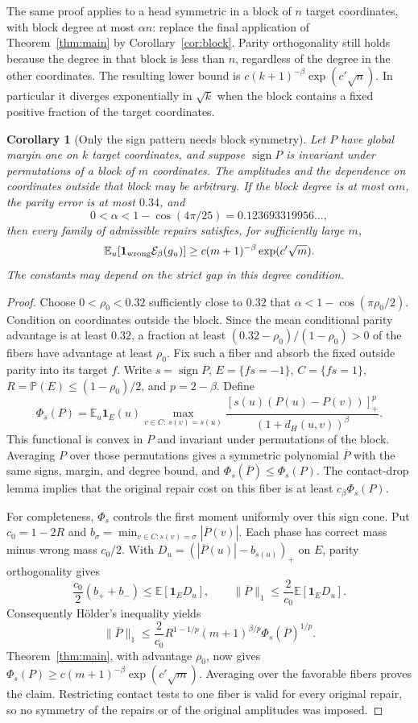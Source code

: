 \documentclass[11pt]{article}
\newtheorem{corollary}[theorem]{Corollary}
\theoremstyle{remark}\newtheorem{remark}[theorem]{Remark}
\newcommand{\E}{\mathbb E}\newcommand{\Prb}{\mathbb P}
\DeclareMathOperator{\sign}{sign}
\begin{document}
The same proof applies to a head symmetric in a block of $n$ target
coordinates, with block degree at most $\alpha n$: replace the final
application of Theorem~\ref{thm:main} by Corollary~\ref{cor:block}.
Parity orthogonality still holds because the degree in that block is
less than $n$, regardless of the degree in the other coordinates.
The resulting lower bound is
$c(k+1)^{-\beta}\exp(c'\sqrt n)$. In particular it diverges
exponentially in $\sqrt k$ when the block contains a fixed positive
fraction of the target coordinates.

\begin{corollary}[Only the sign pattern needs block symmetry]
\label{cor:signblock}
Let $P$ have global margin one on $k$ target coordinates, and suppose
$\sign P$ is invariant under permutations of a block of $m$ coordinates.
The amplitudes and the dependence on coordinates outside that block may
be arbitrary. If the block degree is at most $\alpha m$, the parity
error is at most $0.34$, and
\[
 0<\alpha<1-\cos(4\pi/25)=0.123693319956\ldots,
\]
then every family of admissible repairs satisfies, for sufficiently
large $m$,
\[
 \E_u[\mathbf1_{\rm wrong}\mathcal E_\beta(g_u)]
 \ge c(m+1)^{-\beta}\exp(c'\sqrt m).
\]
The constants may depend on the strict gap in this degree condition.
\end{corollary}
\begin{proof}
Choose $0<\rho_0<0.32$ sufficiently close to $0.32$ that
$\alpha<1-\cos(\pi\rho_0/2)$. Condition on coordinates outside
the block. Since the mean conditional parity advantage is at least
$0.32$, a fraction at least $(0.32-\rho_0)/(1-\rho_0)>0$ of the
fibers have advantage at least $\rho_0$. Fix such a fiber and absorb the fixed outside
parity into its target $f$. Write $s=\sign P$, $E=\{fs=-1\}$,
$C=\{fs=1\}$, $R=\Prb(E)\le(1-\rho_0)/2$, and $p=2-\beta$. Define
\[
 \Phi_s(P)=\E_{u}\mathbf1_E(u)
   \max_{v\in C:\,s(v)=s(u)}
   \frac{[s(u)(P(u)-P(v))]_+^p}{(1+d_H(u,v))^\beta}.
\]
This functional is convex in $P$ and invariant under permutations of
the block. Averaging $P$ over those permutations gives a symmetric
polynomial $\overline P$ with the same signs, margin, and degree bound,
and $\Phi_s(\overline P)\le\Phi_s(P)$. The contact-drop lemma implies
that the original repair cost on this fiber is at least
$c_\beta\Phi_s(P)$.

For completeness, $\Phi_s$ controls the first moment uniformly over
this sign cone. Put $c_0=1-2R$ and
$b_\sigma=\min_{v\in C:s(v)=\sigma}|\overline P(v)|$.
Each phase has correct mass minus wrong mass $c_0/2$. With
$D_u=(|\overline P(u)|-b_{s(u)})_+$ on $E$, parity orthogonality gives
\[
 \frac{c_0}{2}(b_++b_-)\le\E[\mathbf1_E D_u],\qquad
 \|\overline P\|_1\le\frac2{c_0}\E[\mathbf1_E D_u].
\]
Consequently H\"older's inequality yields
\[
 \|\overline P\|_1
 \le\frac2{c_0}R^{1-1/p}(m+1)^{\beta/p}
       \Phi_s(\overline P)^{1/p}.
\]
Theorem~\ref{thm:main}, with advantage $\rho_0$, now gives
$\Phi_s(P)\ge c(m+1)^{-\beta}\exp(c'\sqrt m)$.
Averaging over the favorable fibers proves the claim. Restricting
contact tests to one fiber is valid for every original repair, so no
symmetry of the repairs or of the original amplitudes was imposed.
\end{proof}
\end{document}
